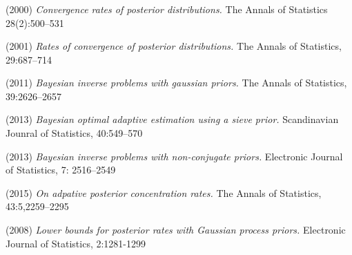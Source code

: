 \begin{frame}
\frametitle{}
{\small{\begin{thebibliography}{10}       
\beamertemplatearticlebibitems

\bibitem{[1]} (2000)
{\ds\it Convergence rates of posterior distributions.}
{\ds The Annals of Statistics 28(2):500–531}

\bibitem{[2]} (2001) 
{\ds\it Rates of convergence of posterior distributions.}
{\ds The Annals of Statistics, 29:687–714}


\bibitem{[3]} (2011) 
{\ds\it Bayesian inverse problems with gaussian priors.}
{\ds The Annals of Statistics, 39:2626–2657}

\bibitem{[4]} (2013) 
{\ds\it Bayesian optimal adaptive estimation using a sieve prior.}
 {\ds Scandinavian Jounral of Statistics, 40:549--570}


\bibitem{[6]} (2013)
{\ds\it Bayesian inverse problems with non-conjugate priors.} 
{\ds Electronic Journal of Statistics, 7: 2516–2549}

\bibitem{[7]} (2015) {\ds\it On adpative posterior concentration rates.} 
{\ds The Annals of Statistics, 43:5,2259--2295}

 \bibitem{[8]} (2008) 
{\ds \it Lower bounds for posterior rates with Gaussian process  priors.}
{\ds Electronic Journal of Statistics, 2:1281-1299}
\end{thebibliography}}}
\end{frame}


